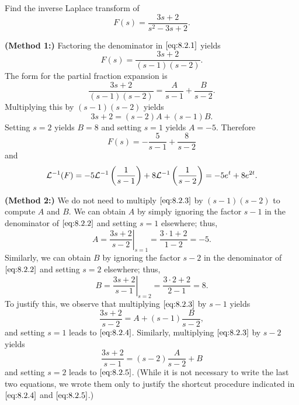 \documentclass{ximera}
\begin{document}
\begin{example}\label{example:8.2.4} Find the inverse Laplace transform
of
\begin{equation}\label{eq:8.2.1}
F(s)=\frac{3s+2}{s^2-3s+2}.
\end{equation}
\begin{explanation}
\textbf{(Method 1:)}
 Factoring the denominator in  $\eqref{eq:8.2.1}$ yields
\begin{equation}\label{eq:8.2.2}
F(s)=\frac{3s+2}{(s-1)(s-2)}.
\end{equation}
The form for the partial fraction expansion is
\begin{equation}\label{eq:8.2.3}
\frac{3s+2}{(s-1)(s-2)}=\frac{A}{s-1}+\frac{B}{s-2}.
\end{equation}
Multiplying this by $(s-1)(s-2)$ yields
$$
3s+2=(s-2)A+(s-1)B.
$$
Setting $s=2$ yields $B=8$ and setting $s=1$ yields $A=-5$. Therefore
$$
F(s)=-\frac{5}{s-1}+\frac{8}{s-2}
$$
and
$$
{\cal L}^{-1}(F)=-5{\cal L}^{-1}\left(\frac{1}{s-1}\right)
+8{\cal L}^{-1}\left(\frac{1}{s-2}\right)=-5e^t+8e^{2t}.
$$
\end{explanation}
\begin{explanation}
\textbf{(Method 2:)}
We do not need to multiply  $\eqref{eq:8.2.3}$ by $(s-1)(s-2)$ to compute $A$ and $B$. We can obtain $A$ by simply ignoring the factor
$s-1$ in the denominator of  $\eqref{eq:8.2.2}$ and setting $s=1$ elsewhere;
thus,
\begin{equation}\label{eq:8.2.4}
A=\left.\frac{3s+2}{s-2}\right|_{s=1}=\frac{3\cdot1+2}{ 1-2}=-5.
\end{equation}
Similarly, we can obtain $B$ by ignoring the factor
$s-2$ in the denominator of  $\eqref{eq:8.2.2}$ and setting $s=2$ elsewhere;
thus,
\begin{equation}\label{eq:8.2.5}
B=\left.\frac{3s+2}{s-1}\right|_{s=2}=\frac{3\cdot2+2}{2-1}=8.
\end{equation}
To justify this, we observe that multiplying $\eqref{eq:8.2.3}$ by $s-1$
yields
$$
\frac{3s+2}{s-2}=A+(s-1)\frac{B}{s-2},
$$
and setting $s=1$ leads to
$\eqref{eq:8.2.4}$. Similarly, multiplying $\eqref{eq:8.2.3}$ by $s-2$ yields
$$
\frac{3s+2}{s-1}=(s-2)\frac{A}{s-2}+B
$$
and setting $s=2$ leads to
$\eqref{eq:8.2.5}$.  (While it is not necessary to write the last two equations, we wrote them only to justify
the shortcut procedure indicated in $\eqref{eq:8.2.4}$ and
$\eqref{eq:8.2.5}$.)
\end{explanation}
\end{example}
\end{document}
